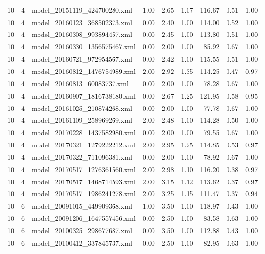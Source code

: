 \begin{table}[ht]
\begin{tabular}{rrlrrrrrr}
   10 &   4 & model\_20151119\_424700280.xml & 1.00 & 2.65 & 1.07 & 116.67 & 0.51 & 1.00 \\ 
   10 &   4 & model\_20160123\_368502373.xml & 0.00 & 2.40 & 1.00 & 114.00 & 0.52 & 1.00 \\ 
   10 &   4 & model\_20160308\_993894457.xml & 0.00 & 2.45 & 1.00 & 113.80 & 0.51 & 1.00 \\ 
   10 &   4 & model\_20160330\_1356575467.xml & 0.00 & 2.00 & 1.00 & 85.92 & 0.67 & 1.00 \\ 
   10 &   4 & model\_20160721\_972954567.xml & 0.00 & 2.42 & 1.00 & 115.55 & 0.51 & 1.00 \\ 
   10 &   4 & model\_20160812\_1476754989.xml & 2.00 & 2.92 & 1.35 & 114.25 & 0.47 & 0.97 \\ 
   10 &   4 & model\_20160813\_60083737.xml & 0.00 & 2.00 & 1.00 & 78.28 & 0.67 & 1.00 \\ 
   10 &   4 & model\_20160907\_1816738180.xml & 0.00 & 2.67 & 1.25 & 121.95 & 0.58 & 0.95 \\ 
   10 &   4 & model\_20161025\_210874268.xml & 0.00 & 2.00 & 1.00 & 77.78 & 0.67 & 1.00 \\ 
   10 &   4 & model\_20161109\_258969269.xml & 2.00 & 2.48 & 1.00 & 114.28 & 0.50 & 1.00 \\ 
   10 &   4 & model\_20170228\_1437582980.xml & 0.00 & 2.00 & 1.00 & 79.55 & 0.67 & 1.00 \\ 
   10 &   4 & model\_20170321\_1279222212.xml & 2.00 & 2.95 & 1.25 & 114.85 & 0.53 & 0.97 \\ 
   10 &   4 & model\_20170322\_711096381.xml & 0.00 & 2.00 & 1.00 & 78.92 & 0.67 & 1.00 \\ 
   10 &   4 & model\_20170517\_1276361560.xml & 2.00 & 2.98 & 1.10 & 116.20 & 0.38 & 0.97 \\ 
   10 &   4 & model\_20170517\_1468714593.xml & 2.00 & 3.15 & 1.12 & 113.62 & 0.37 & 0.97 \\ 
   10 &   4 & model\_20170517\_1986241278.xml & 2.00 & 3.25 & 1.15 & 111.47 & 0.37 & 0.94 \\ 
   10 &   6 & model\_20091015\_449909368.xml & 1.00 & 3.50 & 1.00 & 118.97 & 0.43 & 1.00 \\ 
   10 &   6 & model\_20091206\_1647557456.xml & 0.00 & 2.50 & 1.00 & 83.58 & 0.63 & 1.00 \\ 
   10 &   6 & model\_20100325\_298677687.xml & 0.00 & 3.50 & 1.00 & 112.88 & 0.43 & 1.00 \\ 
   10 &   6 & model\_20100412\_337845737.xml & 0.00 & 2.50 & 1.00 & 82.95 & 0.63 & 1.00 \\ 

\end{tabular}
\end{table}

